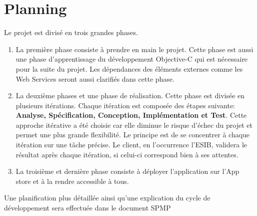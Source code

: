 \section{Planning}

Le projet est divisé en trois grandes phases.
\begin{enumerate}
\item La première phase consiste à prendre en main le projet. Cette phase est aussi une phase d'apprentissage du développement \gls{Objective-C} qui est nécessaire pour la suite du projet. Les dépendances des éléments externes comme les Web Services seront aussi clarifiés dans cette phase.
\item La deuxième phases et une phase de réalisation. Cette phase est divisée en plusieurs itérations. Chaque itération est composée des étapes suivante: \textbf{Analyse, Spécification, Conception, Implémentation et Test}. Cette approche itérative a été choisie car elle diminue le risque d'échec du projet et permet une plus grande flexibilité. Le principe est de se concentrer à chaque itération sur une tâche précise. Le client, en l'occurrence l'\gls{ESIB}, validera le résultat après chaque itération, si celui-ci correspond bien à ses attentes.
\item La troisième et dernière phase consiste à déployer l'application sur l'App store et à la rendre accessible à tous.
\end{enumerate}
Une planification plus détaillée ainsi qu'une explication du cycle de développement sera effectuée dans le document \gls{SPMP}